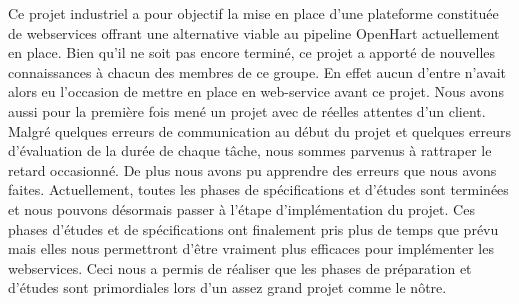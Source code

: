 Ce projet industriel a pour objectif la mise en place d'une plateforme constituée de webservices offrant une alternative viable au pipeline OpenHart actuellement en place. Bien qu'il ne soit pas encore terminé, ce projet a apporté de nouvelles connaissances à chacun des membres de ce groupe. En effet aucun d'entre n'avait alors eu l'occasion de mettre en place en web-service avant ce projet. Nous avons aussi pour la première fois mené un projet avec de réelles attentes d'un client. Malgré quelques erreurs de communication au début du projet et quelques erreurs d'évaluation de la durée de chaque tâche, nous sommes parvenus à rattraper le retard occasionné. De plus nous avons pu apprendre des erreurs que nous avons faites. Actuellement, toutes les phases de spécifications et d'études sont terminées et nous pouvons désormais passer à l'étape d'implémentation du projet. Ces phases d'études et de spécifications ont finalement pris plus de temps que prévu mais elles nous permettront d'être vraiment plus efficaces pour implémenter les webservices. Ceci nous a permis de réaliser que les phases de préparation et d'études sont primordiales lors d'un assez grand projet comme le nôtre.